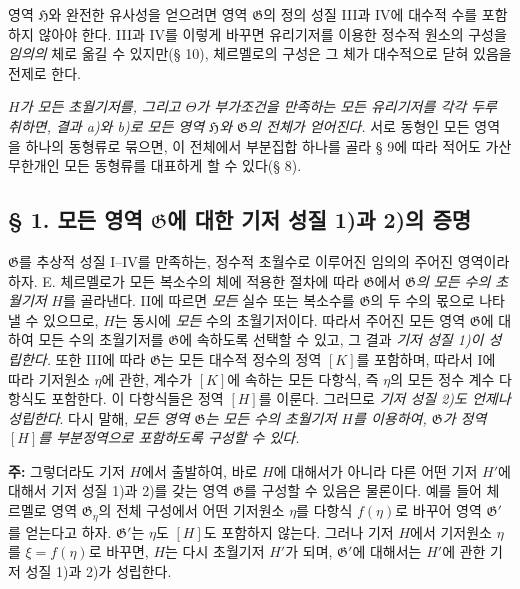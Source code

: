 영역 $\mathfrak H$와 완전한 유사성을 얻으려면 영역 $\mathfrak G$의 정의 성질 III과 IV에 대수적 수를 포함하지 않아야 한다. III과 IV를 이렇게 바꾸면 유리기저를 이용한 정수적 원소의 구성을 \emph{임의의} 체로 옮길 수 있지만(§ 10), 체르멜로의 구성은 그 체가 대수적으로 닫혀 있음을 전제로 한다.

\emph{$H$가 모든 초월기저를, 그리고 $\Theta$가 부가조건을 만족하는 모든 유리기저를 각각 두루 취하면, 결과 a)와 b)로 모든 영역 $\mathfrak H$와 $\mathfrak G$의 전체가 얻어진다.} 서로 동형인 모든 영역을 하나의 동형류로 묶으면, 이 전체에서 부분집합 하나를 골라 § 9에 따라 적어도 가산무한개인 모든 동형류를 대표하게 할 수 있다(§ 8).

\subsection*{§ 1. 모든 영역 $\mathfrak G$에 대한 기저 성질 1)과 2)의 증명}

$\mathfrak G$를 추상적 성질 I--IV를 만족하는, 정수적 초월수로 이루어진 임의의 주어진 영역이라 하자. E. 체르멜로가 모든 복소수의 체에 적용한 절차에 따라 $\mathfrak G$에서 \emph{$\mathfrak G$의 모든 수의 초월기저} $H$를 골라낸다. II에 따르면 \emph{모든} 실수 또는 복소수를 $\mathfrak G$의 두 수의 몫으로 나타낼 수 있으므로, $H$는 동시에 \emph{모든} 수의 초월기저이다. 따라서 주어진 모든 영역 $\mathfrak G$에 대하여 모든 수의 초월기저를 $\mathfrak G$에 속하도록 선택할 수 있고, 그 결과 \emph{기저 성질 1)이 성립한다.} 또한 III에 따라 $\mathfrak G$는 모든 대수적 정수의 정역 $[K]$를 포함하며, 따라서 I에 따라 기저원소 $\eta$에 관한, 계수가 $[K]$에 속하는 모든 다항식, 즉 $\eta$의 모든 정수 계수 다항식도 포함한다. 이 다항식들은 정역 $[H]$를 이룬다. 그러므로 \emph{기저 성질 2)도 언제나 성립한다}. 다시 말해, \emph{모든 영역 $\mathfrak G$는 모든 수의 초월기저 $H$를 이용하여, $\mathfrak G$가 정역 $[H]$를 부분정역으로 포함하도록 구성할 수 있다.}

\textbf{주:} 그렇더라도 기저 $H$에서 출발하여, 바로 $H$에 대해서가 아니라 다른 어떤 기저 $H'$에 대해서 기저 성질 1)과 2)를 갖는 영역 $\mathfrak G$를 구성할 수 있음은 물론이다. 예를 들어 체르멜로 영역 $\mathfrak G_\eta$의 전체 구성에서 어떤 기저원소 $\eta$를 다항식 $f(\eta)$로 바꾸어 영역 $\mathfrak G'$를 얻는다고 하자. $\mathfrak G'$는 $\eta$도 $[H]$도 포함하지 않는다. 그러나 기저 $H$에서 기저원소 $\eta$를 $\xi=f(\eta)$로 바꾸면, $H$는 다시 초월기저 $H'$가 되며, $\mathfrak G'$에 대해서는 $H'$에 관한 기저 성질 1)과 2)가 성립한다.

